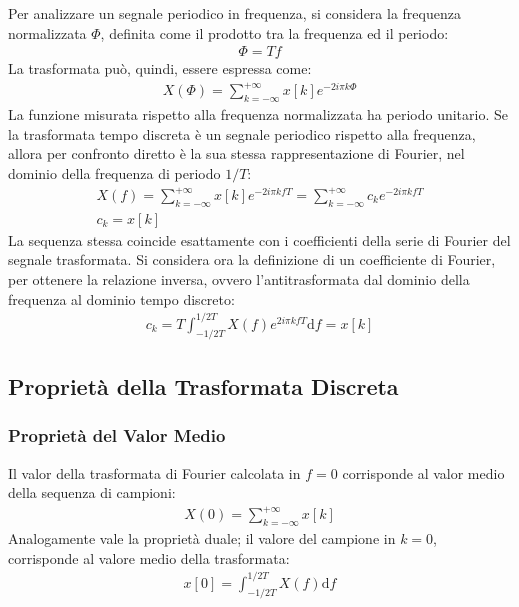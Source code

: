 \documentclass{article}
\newcommand{\df}{\mathrm{d}}
\numberwithin{equation}{subsection}
\begin{document}
Per analizzare un segnale periodico in frequenza, si considera la frequenza normalizzata $\Phi$, definita come il prodotto tra la frequenza ed il periodo:
\begin{gather}
    \Phi=Tf
\end{gather}
La trasformata può, quindi, essere espressa come:
\begin{gather}
    X(\Phi)=\displaystyle\sum_{k=-\infty}^{+\infty}x[k]e^{-2i\pi k\Phi}
\end{gather}
La funzione misurata rispetto alla frequenza normalizzata ha periodo unitario. 
Se la trasformata tempo discreta è un segnale periodico rispetto alla frequenza, allora per confronto diretto è la sua stessa rappresentazione di Fourier, nel dominio della 
frequenza di periodo $1/T$:
\begin{gather*}
    X(f)=\displaystyle\sum_{k=-\infty}^{+\infty}x[k]e^{-2i\pi kfT}=\sum_{k=-\infty}^{+\infty}c_ke^{-2i\pi kfT}\\
    c_k=x[k]
\end{gather*}
La sequenza stessa coincide esattamente con i coefficienti della serie di Fourier del segnale trasformata. Si considera ora la definizione di un coefficiente di Fourier, 
per ottenere la relazione inversa, ovvero l'antitrasformata dal dominio della frequenza al dominio tempo discreto:
\begin{gather}
    c_k=\displaystyle T\int_{-1/2T}^{1/2T}X(f)e^{2i\pi kfT}\df f=x[k]
\end{gather}

\subsection{Proprietà della Trasformata Discreta}

\subsubsection{Proprietà del Valor Medio}

Il valor della trasformata di Fourier calcolata in $f=0$ corrisponde al valor medio della sequenza di campioni:
\begin{gather}
    X(0)=\displaystyle\sum_{k=-\infty}^{+\infty}x[k]
\end{gather}
Analogamente vale la proprietà duale; il valore del campione in $k=0$, corrisponde al valore medio della trasformata:
\begin{gather}
    x[0]=\displaystyle\int_{-1/2T}^{1/2T}X(f)\df f
\end{gather}
\end{document}
